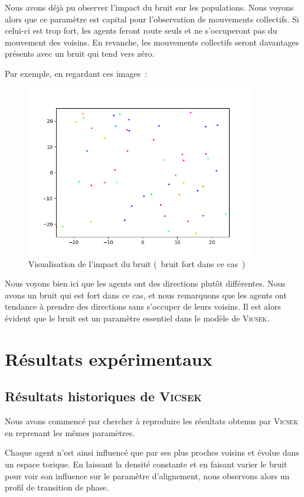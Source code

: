 \documentclass[french, a4paper, 12pt, openany]{report}
\begin{document}
   Nous avons déjà pu observer l'impact du bruit sur les populations. Nous voyons alors que ce paramètre est capital pour l'observation de mouvements collectifs. Si celui-ci est trop fort, les agents feront route seuls et ne s'occuperont pas du mouvement des voisins. En revanche, les mouvements collectifs seront davantages présents avec un bruit qui tend vers zéro.

Par exemple, en regardant ces images~:

   \begin{figure}[!h]
		\centering
		\includegraphics[width=10cm]{images/image_10.png}
		\caption{Visualisation de l'impact du bruit (~bruit fort dans ce cas~)}
		\label{bruit}
	\end{figure}  

	
Nous voyons bien ici que les agents ont des directions plutôt différentes. Nous avons un bruit qui est fort dans ce cas, et nous remarquons que les agents ont tendance à prendre des directions sans s'occuper de leurs voisins. Il est alors évident que le bruit est un paramètre essentiel dans le modèle de \textsc{Vicsek}.
   
\chapter{Résultats expérimentaux}
\section{Résultats historiques de \textsc{Vicsek}}
	Nous avons commencé par chercher à reproduire les résultats obtenus par \textsc{Vicsek} en reprenant les mêmes paramètres.
	
	Chaque agent n'est ainsi influencé que par ses plus proches voisins et évolue dans un espace torique. En laissant la densité constante et en faisant varier le bruit pour voir son influence sur le paramètre d'alignement, nous observons alors un profil de transition de phase.
	
\end{document}
